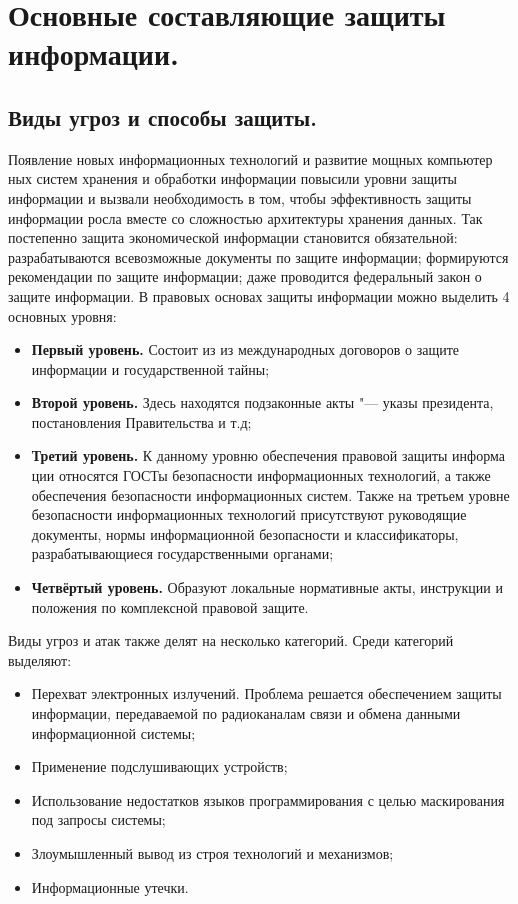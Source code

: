 \section{Основные составляющие защиты информации.}
\subsection{Виды угроз и способы защиты.}
Появление новых информационных технологий и развитие мощных компьютер
ных систем хранения и обработки информации повысили уровни защиты информации и вызвали 
необходимость в том, чтобы эффективность защиты информации росла вместе со сложностью архитектуры хранения данных. Так постепенно защита экономической информации 
становится обязательной: разрабатываются всевозможные документы по защите информации; формируются рекомендации по защите информации; даже проводится федеральный закон 
о защите информации. В правовых основах защиты информации можно выделить 4 основных уровня:
\begin{itemize}
    \item \textbf{Первый уровень.} Состоит из из международных договоров о защите информации и государственной тайны;
    \item \textbf{Второй уровень.} Здесь находятся подзаконные акты "--- указы президента, постановления Правительства и т.д;
    \item \textbf{Третий уровень.} К данному уровню обеспечения правовой защиты информа
    ции относятся ГОСТы безопасности информационных технологий, а также обеспечения безопасности информационных систем.
    Также на третьем уровне безопасности информационных технологий присутствуют руководящие документы, нормы информационной безопасности и классификаторы, разрабатывающиеся 
    государственными органами;
    \item \textbf{Четвёртый уровень.} Образуют локальные нормативные акты, инструкции и положения по комплексной правовой защите.\cite{def_inf}
\end{itemize}
Виды угроз и атак также делят на несколько категорий. Среди категорий выделяют:
\begin{itemize}
    \item Перехват электронных излучений. Проблема решается обеспечением защиты информации, передаваемой по радиоканалам связи и обмена данными 
    информационной системы;
    \item Применение подслушивающих устройств;
    \item Использование недостатков языков программирования с целью маскирования под запросы системы;
    \item Злоумышленный вывод из строя технологий и механизмов;
    \item Информационные утечки.
\end{itemize}

